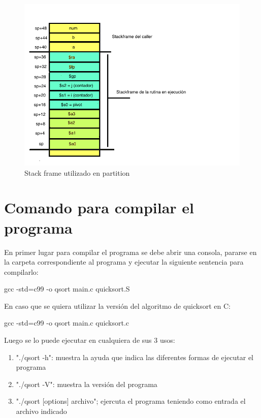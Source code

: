 \documentclass[a4paper,10pt]{article}
\numberwithin{equation}{section}
\numberwithin{figure}{section}
\begin{document}
\begin{figure}[h]
  \centering
    \includegraphics[width=1\textwidth]{partition_stack.png}
  \caption{Stack frame utilizado en partition}
  \label{fig:stack}
\end{figure}


\section{Comando para compilar el programa} 

En primer lugar para compilar el programa se debe abrir una consola, pararse en la carpeta correspondiente al programa y ejecutar la siguiente sentencia para compilarlo:

\begin{center}
gcc -std=c99 -o qsort main.c quicksort.S
\end{center}

En caso que se quiera utilizar la versión del algoritmo de quicksort en C:

\begin{center}
gcc -std=c99 -o qsort main.c quicksort.c
\end{center}


Luego se lo puede ejecutar en cualquiera de sus 3 usos:

\begin{enumerate}
	\item "./qsort -h": muestra la ayuda que indica las diferentes formas de ejecutar el programa 
	\item "./qsort -V": muestra la versión del programa
	\item "./qsort [options] archivo"; ejercuta el programa teniendo como entrada el archivo indicado
\end{enumerate}
\end{document}
